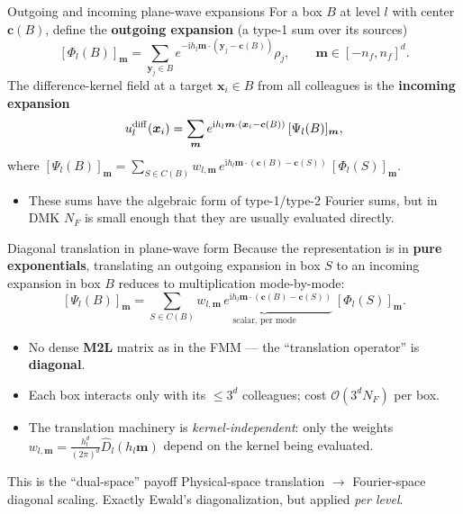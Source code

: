 \documentclass[aspectratio=169,11pt]{beamer}
\newcommand{\cO}{\mathcal{O}}
\newcommand{\ii}{\mathrm i}
\newcommand{\x}{\bm{x}}
\newcommand{\y}{\bm{y}}
\newcommand{\mm}{\bm{m}}
\newcommand{\cc}{\bm{c}}
\newcommand{\hl}[1]{{\color{CCMorange}\textbf{#1}}}
\begin{document}
\begin{frame}{Outgoing and incoming plane-wave expansions}
\small
For a box \(B\) at level \(l\) with center \(\cc(B)\), define the \hl{outgoing expansion} (a type-1 sum over its sources)
\[
  [\Phi_l(B)]_{\mm}=\sum_{\y_j\in B} e^{-\ii h_l\mm\cdot(\y_j-\cc(B))}\rho_j,\qquad \mm\in[-n_f,n_f]^d .
\]
The difference-kernel field at a target \(\x_i\in B\) from all colleagues is the \hl{incoming expansion}
\[
  u_l^{\rm diff}(\x_i)=\sum_{\mm} e^{\ii h_l\mm\cdot(\x_i-\cc(B))}\,[\Psi_l(B)]_{\mm},
\]
where \([\Psi_l(B)]_{\mm}=\displaystyle\sum_{S\in C(B)} w_{l,\mm}\,e^{\ii h_l\mm\cdot(\cc(B)-\cc(S))}\,[\Phi_l(S)]_{\mm}.\)
\begin{itemize}
  \item These sums have the algebraic form of type-1/type-2 Fourier sums, but
  in DMK \(N_F\) is small enough that they are usually evaluated directly.
\end{itemize}
\end{frame}

\begin{frame}{Diagonal translation in plane-wave form}
\small
Because the representation is in \hl{pure exponentials}, translating an
outgoing expansion in box \(S\) to an incoming expansion in box \(B\) reduces
to multiplication mode-by-mode:
\[
  [\Psi_l(B)]_{\mm}=\sum_{S\in C(B)} \underbrace{w_{l,\mm}\,e^{\ii h_l\mm\cdot(\cc(B)-\cc(S))}}_{\text{scalar, per mode}}\ [\Phi_l(S)]_{\mm}.
\]
\begin{itemize}
  \item No dense \hl{M2L} matrix as in the FMM --- the ``translation operator'' is \hl{diagonal}.
  \item Each box interacts only with its \(\le 3^d\) colleagues; cost \(\cO(3^d N_F)\) per box.
  \item The translation machinery is \emph{kernel-independent}: only the weights \(w_{l,\mm}=\tfrac{h_l^d}{(2\pi)^d}\widehat D_l(h_l\mm)\) depend on the kernel being evaluated.
\end{itemize}
\begin{block}{This is the ``dual-space'' payoff}
Physical-space translation \(\to\) Fourier-space diagonal scaling. Exactly Ewald's diagonalization, but applied \emph{per level}.
\end{block}
\end{frame}
\end{document}
